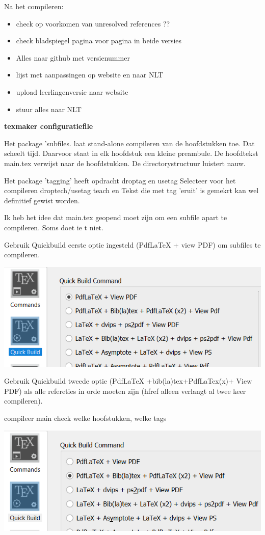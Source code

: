 \documentclass[../../main.tex]{subfiles}
\begin{document}
Na het compileren: 
\begin{itemize}[nosep]
\item check op voorkomen van unresolved references ??
\item check bladspiegel pagina voor pagina in beide versies
\item Alles naar github met versienummer
\item lijst met aanpassingen op website en naar NLT
\item upload leerlingenversie naar website 
\item stuur alles naar NLT
\end{itemize}


\textbf{texmaker configuratiefile}


Het package 'subfiles. laat stand-alone compileren van de hoofdstukken toe. Dat scheelt tijd. Daarvoor staat in elk hoofdstuk een kleine preambule.
De hoofdtekst main.tex verwijst naar de hoofdstukken. De directorystructuur luistert nauw.

Het package 'tagging' heeft opdracht droptag en usetag
Selecteer voor het compileren droptech/usetag teach en 
Tekst die met tag 'eruit' is gemekrt kan wel definitief gewist worden.

Ik heb het idee dat main.tex geopend moet zijn om een subfile apart te compileren. Soms doet ie t niet.

Gebruik Quickbuild eerste optie ingesteld (PdfLaTeX + view PDF) om subfiles te compileren.

\includegraphics[width=\textwidth]{./img/quickbuild1.PNG}

Gebruik Quickbuild tweede optie (PdfLaTeX +bib(la)tex+PdfLaTex(x)+ View PDF) als alle refereties in orde moeten zijn (hfref alleen verlangt al twee keer compileren). 

compileer main check welke hoofstukken, welke tags


\includegraphics[width=\textwidth]{./img/quickbuild2.PNG}
\end{document}
